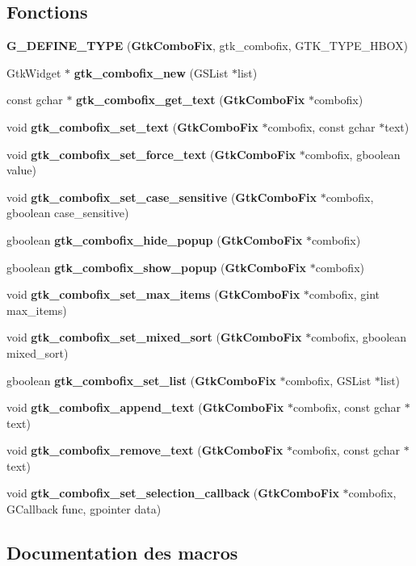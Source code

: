 \subsection*{Fonctions}
\begin{DoxyCompactItemize}
\item 
{\bf G\_\-DEFINE\_\-TYPE} ({\bf GtkComboFix}, gtk\_\-combofix, GTK\_\-TYPE\_\-HBOX)
\item 
GtkWidget $\ast$ {\bf gtk\_\-combofix\_\-new} (GSList $\ast$list)
\item 
const gchar $\ast$ {\bf gtk\_\-combofix\_\-get\_\-text} ({\bf GtkComboFix} $\ast$combofix)
\item 
void {\bf gtk\_\-combofix\_\-set\_\-text} ({\bf GtkComboFix} $\ast$combofix, const gchar $\ast$text)
\item 
void {\bf gtk\_\-combofix\_\-set\_\-force\_\-text} ({\bf GtkComboFix} $\ast$combofix, gboolean value)
\item 
void {\bf gtk\_\-combofix\_\-set\_\-case\_\-sensitive} ({\bf GtkComboFix} $\ast$combofix, gboolean case\_\-sensitive)
\item 
gboolean {\bf gtk\_\-combofix\_\-hide\_\-popup} ({\bf GtkComboFix} $\ast$combofix)
\item 
gboolean {\bf gtk\_\-combofix\_\-show\_\-popup} ({\bf GtkComboFix} $\ast$combofix)
\item 
void {\bf gtk\_\-combofix\_\-set\_\-max\_\-items} ({\bf GtkComboFix} $\ast$combofix, gint max\_\-items)
\item 
void {\bf gtk\_\-combofix\_\-set\_\-mixed\_\-sort} ({\bf GtkComboFix} $\ast$combofix, gboolean mixed\_\-sort)
\item 
gboolean {\bf gtk\_\-combofix\_\-set\_\-list} ({\bf GtkComboFix} $\ast$combofix, GSList $\ast$list)
\item 
void {\bf gtk\_\-combofix\_\-append\_\-text} ({\bf GtkComboFix} $\ast$combofix, const gchar $\ast$text)
\item 
void {\bf gtk\_\-combofix\_\-remove\_\-text} ({\bf GtkComboFix} $\ast$combofix, const gchar $\ast$text)
\item 
void {\bf gtk\_\-combofix\_\-set\_\-selection\_\-callback} ({\bf GtkComboFix} $\ast$combofix, GCallback func, gpointer data)
\end{DoxyCompactItemize}


\subsection{Documentation des macros}
